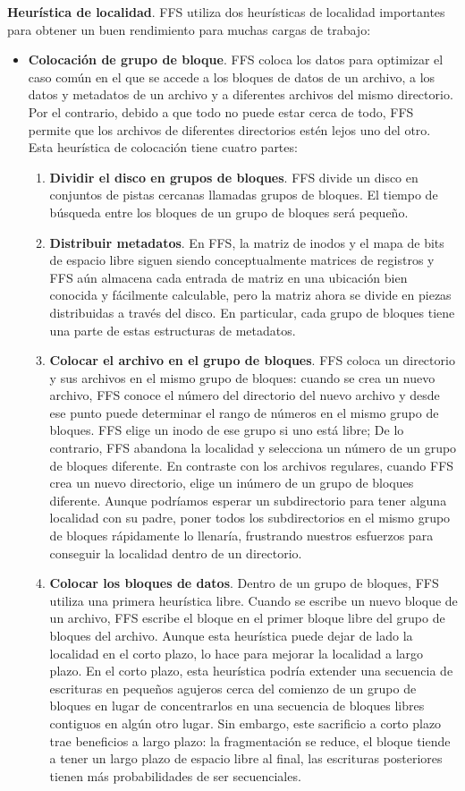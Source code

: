 \documentclass[10pt]{book}
\begin{document}
\textbf{Heurística de localidad}. FFS utiliza dos heurísticas de localidad importantes para obtener un buen rendimiento para muchas cargas de trabajo:
\begin{itemize}
\item \textbf{Colocación de grupo de bloque}. FFS coloca los datos para optimizar el caso común en el que se accede a los bloques de datos de un archivo, a los datos y metadatos de un archivo y a diferentes archivos del mismo directorio. Por el contrario, debido a que todo no puede estar cerca de todo, FFS permite que los archivos de diferentes directorios estén lejos uno del otro. Esta heurística de colocación tiene cuatro partes:
\begin{enumerate}
\item \textbf{Dividir el disco en grupos de bloques}. FFS divide un disco en conjuntos de pistas cercanas llamadas grupos de bloques. El tiempo de búsqueda entre los bloques de un grupo de bloques será pequeño.
\item \textbf{Distribuir metadatos}. En FFS, la matriz de inodos y el mapa de bits de espacio libre siguen siendo conceptualmente matrices de registros y FFS aún almacena cada entrada de matriz en una ubicación bien conocida y fácilmente calculable, pero la matriz ahora se divide en piezas distribuidas a través del disco. En particular, cada grupo de bloques tiene una parte de estas estructuras de metadatos.
\item \textbf{Colocar el archivo en el grupo de bloques}. FFS coloca un directorio y sus archivos en el mismo grupo de bloques: cuando se crea un nuevo archivo, FFS conoce el número del directorio del nuevo archivo y desde ese punto puede determinar el rango de números en el mismo grupo de bloques. FFS elige un inodo de ese grupo si uno está libre; De lo contrario, FFS abandona la localidad y selecciona un número de un grupo de bloques diferente. En contraste con los archivos regulares, cuando FFS crea un nuevo directorio, elige un inúmero de un grupo de bloques diferente. Aunque podríamos esperar un subdirectorio para tener alguna localidad con su padre, poner todos los subdirectorios en el mismo grupo de bloques rápidamente lo llenaría, frustrando nuestros esfuerzos para conseguir la localidad dentro de un directorio.
\item \textbf{Colocar los bloques de datos}. Dentro de un grupo de bloques, FFS utiliza una primera heurística libre. Cuando se escribe un nuevo bloque de un archivo, FFS escribe el bloque en el primer bloque libre del grupo de bloques del archivo. Aunque esta heurística puede dejar de lado la localidad en el corto plazo, lo hace para mejorar la localidad a largo plazo. En el corto plazo, esta heurística podría extender una secuencia de escrituras en pequeños agujeros cerca del comienzo de un grupo de bloques en lugar de concentrarlos en una secuencia de bloques libres contiguos en algún otro lugar. Sin embargo, este sacrificio a corto plazo trae beneficios a largo plazo: la fragmentación se reduce, el bloque tiende a tener un largo plazo de espacio libre al final, las escrituras posteriores tienen más probabilidades de ser secuenciales.


\end{enumerate}
\end{itemize}
\end{document}
